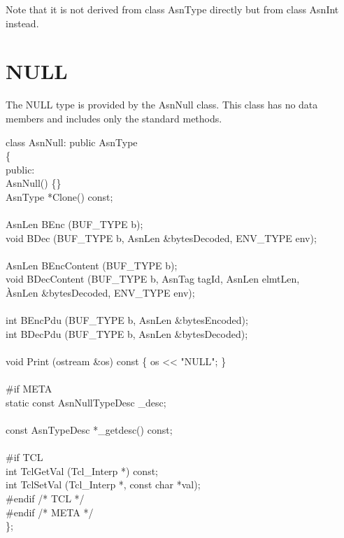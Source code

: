 Note that it is not derived from {\C class AsnType} directly but from {\C class AsnInt} instead.

\section{\label{null-C++-section}NULL}

The NULL type is provided by the {\C AsnNull} class.  This class has
no data members and includes only the standard methods.
\begin{Ccode}
class AsnNull: public AsnType\\
\{\\
public:\+\\
				\>\>AsnNull() \{\}\\
  AsnType			\>\>*Clone() const;\\
\\
  AsnLen			\>\>BEnc (BUF\_TYPE b);\\
  void				\>\>BDec (BUF\_TYPE b, AsnLen \&bytesDecoded, ENV\_TYPE env);\\
\\
  AsnLen			\>\>BEncContent (BUF\_TYPE b);\\
  void				\>\>BDecContent (BUF\_TYPE b, AsnTag tagId, AsnLen elmtLen,\\
					\`AsnLen \&bytesDecoded, ENV\_TYPE env);\\
\\
  int				\>\>BEncPdu (BUF\_TYPE b, AsnLen \&bytesEncoded);\\
  int				\>\>BDecPdu (BUF\_TYPE b, AsnLen \&bytesDecoded);\\
\\
  void				\>\>Print (ostream \&os) const \{ os <\/< "NULL"; \}\\
\\
\<\#if META\\
  static const AsnNullTypeDesc	\>\>\_desc;\\
\\
  const AsnTypeDesc		\>\>*\_getdesc() const;\\
\\
\<\#if TCL\\
  int				\>\>TclGetVal (Tcl\_Interp *) const;\\
  int				\>\>TclSetVal (Tcl\_Interp *, const char *val);\-\\
\#endif /* TCL */\\
\#endif /* META */\\
\};
\end{Ccode}

